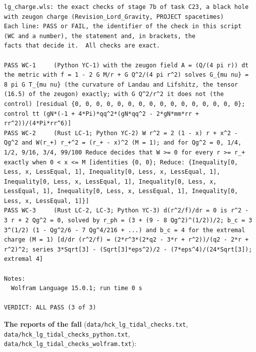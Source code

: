 \documentclass[
  10pt,
]{article}
\begin{document}
\begin{verbatim}
lg_charge.wls: the exact checks of stage 7b of task C23, a black hole with zeugon charge (Revision_Lord_Gravity, PROJECT spacetimes)
Each line: PASS or FAIL, the identifier of the check in this script (WC and a number), the statement and, in brackets, the
facts that decide it.  All checks are exact.

PASS WC-1     (Python YC-1) with the zeugon field A = (Q/(4 pi r)) dt the metric with f = 1 - 2 G M/r + G Q^2/(4 pi r^2) solves G_{mu nu} = 8 pi G T_{mu nu} (the curvature of Landau and Lifshitz, the tensor (16.5) of the zeugon) exactly; with G Q^2/r^2 it does not (the control) [residual {0, 0, 0, 0, 0, 0, 0, 0, 0, 0, 0, 0, 0, 0, 0, 0}; control tt (gN*(-1 + 4*Pi)*qq^2*(gN*qq^2 - 2*gN*mm*rr + rr^2))/(4*Pi*rr^6)]
PASS WC-2     (Rust LC-1; Python YC-2) W r^2 = 2 (1 - x) r + x^2 - Qg^2 and W(r_+) r_+^2 = (r_+ - x)^2 (M = 1); and for Qg^2 = 0, 1/4, 1/2, 9/16, 3/4, 99/100 Reduce decides that W >= 0 for every r >= r_+ exactly when 0 < x <= M [identities {0, 0}; Reduce: {Inequality[0, Less, x, LessEqual, 1], Inequality[0, Less, x, LessEqual, 1], Inequality[0, Less, x, LessEqual, 1], Inequality[0, Less, x, LessEqual, 1], Inequality[0, Less, x, LessEqual, 1], Inequality[0, Less, x, LessEqual, 1]}]
PASS WC-3     (Rust LC-2, LC-3; Python YC-3) d(r^2/f)/dr = 0 is r^2 - 3 r + 2 Qg^2 = 0, solved by r_ph = (3 + (9 - 8 Qg^2)^(1/2))/2; b_c = 3 3^(1/2) (1 - Qg^2/6 - 7 Qg^4/216 + ...) and b_c = 4 for the extremal charge (M = 1) [d/dr (r^2/f) = (2*r^3*(2*q2 - 3*r + r^2))/(q2 - 2*r + r^2)^2; series 3*Sqrt[3] - (Sqrt[3]*eps^2)/2 - (7*eps^4)/(24*Sqrt[3]); extremal 4]

Notes:
  Wolfram Language 15.0.1; run time 0 s

VERDICT: ALL PASS (3 of 3)
\end{verbatim}

\textbf{The reports of the fall}
(\texttt{data/hck\_lg\_tidal\_checks.txt},
\texttt{data/hck\_lg\_tidal\_checks\_python.txt},
\texttt{data/hck\_lg\_tidal\_checks\_wolfram.txt}):
\end{document}
